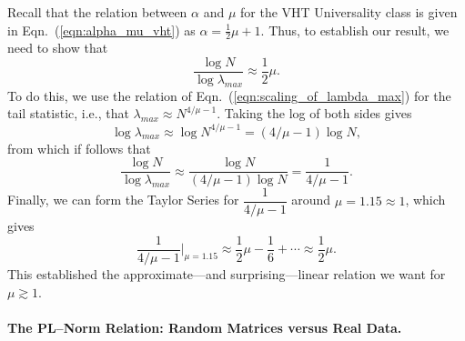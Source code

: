 Recall that the relation between $\alpha$ and $\mu$ for the VHT Universality class is given in Eqn.~(\ref{eqn:alpha_mu_vht}) as
$ %
\alpha=\frac{1}{2}\mu+1  .
$ %
Thus, to establish our result, we need to show that
$$
\dfrac{\log N}{\log\lambda_{max}}\approx\dfrac{1}{2}\mu  .
$$
To do this, we use the relation of Eqn.~(\ref{eqn:scaling_of_lambda_max}) for the tail statistic, i.e., that 
$ %
\lambda_{max}\approx N^{4/\mu-1}  .
$ %
Taking the log of both sides gives
$$
\log\lambda_{max}\approx\log N^{4/\mu-1}=(4/\mu-1)\log N  ,
$$
from which if follows that
$$
\dfrac{\log N}{\log\lambda_{max}}\approx\dfrac{\log N}{(4/\mu-1)\log N}=\dfrac{1}{4/\mu-1}   .
$$
Finally, we can form the Taylor Series for $\dfrac{1}{4/\mu-1}$ around $\mu=1.15\approx 1$, which gives 
$$
\dfrac{1}{4/\mu-1}\bigg\rvert_{\mu=1.15}\approx\dfrac{1}{2}\mu-\dfrac{1}{6}+\cdots\approx\dfrac{1}{2}\mu  .
$$
This established the approximate---and surprising---linear relation we want for $\mu \gtrsim 1$. 




\paragraph{The PL--Norm Relation: Random Matrices versus Real Data.}

